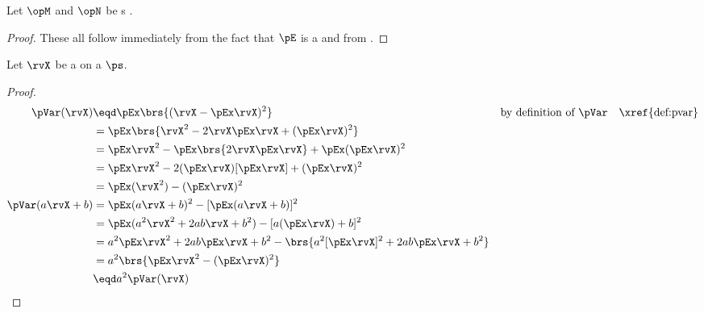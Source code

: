\begin{corollary}
Let $\opM$ and $\opN$ be s .
\end{corollary}
\begin{proof}
These all follow immediately from the fact that $\pE$ is a  
and from .
\end{proof}

\begin{corollary}
\label{cor:pVar}
Let $\rvX$ be a  on a  $\ps$.
\end{corollary}
\begin{proof}
\begin{align*}
  \pVar(\rvX)
    &\eqd \pEx\brs{(\rvX-\pEx\rvX)^2}
    &&    \text{by definition of $\pVar$}
    &&    \text{\xref{def:pvar}}
  \\&=    \pEx\brs{\rvX^2-2\rvX\pEx\rvX + (\pEx\rvX)^2 }
  \\&=    \pEx\rvX^2  - \pEx\brs{2\rvX\pEx\rvX}  + \pEx (\pEx\rvX)^2
  \\&=    \pEx\rvX^2 - 2(\pEx\rvX)[\pEx\rvX] + (\pEx\rvX)^2
  \\&=    \pEx(\rvX^2) - (\pEx\rvX)^2
\\
  \pVar(a\rvX+b)
    &=    \pEx(a\rvX+b)^2  - [\pEx(a\rvX+b)]^2
  \\&=    \pEx(a^2\rvX^2+2ab\rvX+b^2)  - [a(\pEx\rvX)+b]^2
  \\&=    a^2 \pEx\rvX^2  +2ab\pEx\rvX + b^2 - \brs{a^2[\pEx\rvX]^2 + 2ab\pEx\rvX + b^2}
  \\&=    a^2\brs{ \pEx\rvX^2  - (\pEx\rvX)^2 }
  \\&\eqd a^2 \pVar(\rvX)
\end{align*}
\end{proof}

